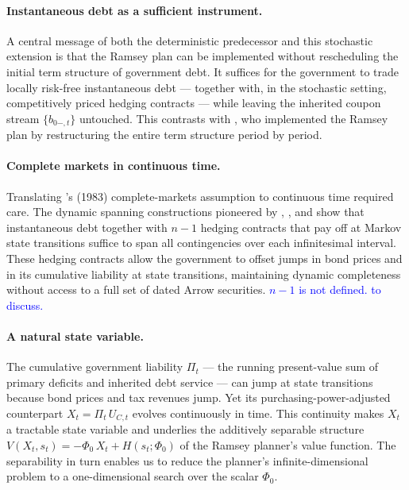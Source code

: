 \documentclass[12pt]{article}
\newcommand{\NW}[1]{{\textcolor{blue}{#1}}}
\begin{document}
\paragraph{Instantaneous debt as a sufficient instrument.}
A central message of both the deterministic predecessor and this stochastic extension is that the Ramsey plan can be implemented without rescheduling the initial term structure of government debt.  It suffices for the government to trade locally risk-free instantaneous debt --- together with, in the stochastic setting, competitively priced hedging contracts --- while leaving the inherited coupon stream $\{b_{0-,t}\}$ untouched.  This contrasts with \cite{LucasStokey1983}, who implemented the Ramsey plan by restructuring the entire term structure period by period.

\paragraph{Complete markets in continuous time.}
Translating \citeauthor{LucasStokey1983}'s (1983) complete-markets assumption to continuous time required care. The dynamic spanning constructions pioneered by \cite{BlackScholes1973}, \cite{merton1973theory}, and \cite{HarrisonandKreps1979} show that instantaneous debt together with $n-1$ hedging contracts that pay off at Markov state transitions suffice to span all contingencies over each infinitesimal interval.  These hedging contracts allow the government to offset jumps in bond prices and in its cumulative liability at state transitions, maintaining dynamic completeness without access to a  full set of dated Arrow securities. \NW{$n-1$ is not defined. to discuss.} 

\paragraph{A natural state variable.}
The cumulative government liability $\Pi_t$ --- the running present-value sum of primary deficits and inherited debt service --- can jump at state transitions because bond prices and tax revenues jump.  Yet its purchasing-power-adjusted counterpart $X_t = \Pi_t\, U_{C,t}$ evolves continuously in time.  This continuity makes $X_t$ a tractable state variable and underlies the additively separable structure $V(X_t,s_t) = -\Phi_0\, X_t + H(s_t; \Phi_0)$ of the Ramsey planner's value function.  The separability in turn enables us to reduce the planner's infinite-dimensional problem to a one-dimensional search  over the scalar $\Phi_0$.
\end{document}
